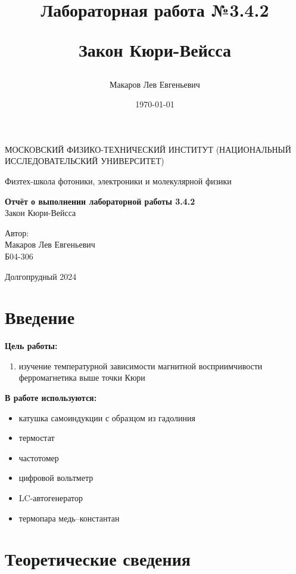 \documentclass[a4paper,12pt]{article}
\author{Макаров Лев Евгеньевич}
\title{Лабораторная работа №3.4.2

Закон Кюри-Вейсса
}
\date{\today}
\begin{document}
\begin{titlepage}
	\begin{center}
		{\large МОСКОВСКИЙ ФИЗИКО-ТЕХНИЧЕСКИЙ ИНСТИТУТ (НАЦИОНАЛЬНЫЙ ИССЛЕДОВАТЕЛЬСКИЙ УНИВЕРСИТЕТ)}
	\end{center}
	\begin{center}
		{\large Физтех-школа фотоники, электроники и молекулярной физики}
	\end{center}
	
	
	\vspace{4.5cm}
	{\huge
		\begin{center}
			{\bf Отчёт о выполнении лабораторной работы 3.4.2}\\
			Закон Кюри-Вейсса
		\end{center}
	}
	\vspace{2cm}
	\begin{flushright}
		{\LARGE Автор:\\ Макаров Лев Евгеньевич \\
			\vspace{0.2cm}
			Б04-306}
	\end{flushright}
	\vspace{8cm}
	\begin{center}
		Долгопрудный 2024
	\end{center}
\end{titlepage}

\section{Введение}

\textbf{Цель работы:} 
\begin{enumerate}
	\item изучение температурной зависимости магнитной восприимчивости ферромагнетика выше точки Кюри
\end{enumerate}

\textbf{В работе используются:} 
\begin{itemize}
    \item катушка самоиндукции с образцом из гадолиния
    \item термостат
    \item частотомер
    \item цифровой вольтметр
    \item LC-автогенератор
    \item термопара медь–константан
\end{itemize}
\medskip

\section{Теоретические сведения}
\end{document}
